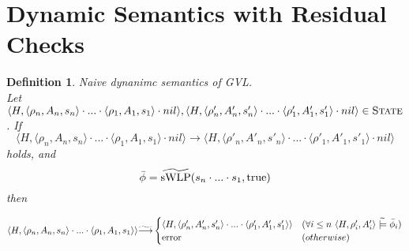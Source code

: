 \documentclass {article}
\newtheorem{definition}[theorem]{Definition}
\newcommand{\true}{\text{true}}
\newcommand{\tconsistent}{\hspace{1mm}\widetilde{\models}\hspace{1mm}}
\newcommand{\tswlp}[2]{\widetilde{\textup{sWLP}}(#1,#2)}
\newcommand{\error}{\text{error}}
\begin{document}
\section{Dynamic Semantics with Residual Checks}
\begin{definition} Naive dynanimc semantics of GVL.\\
Let $\langle H,\langle \rho_n, A_n, s_n\rangle \cdot ... \cdot \langle \rho_1, A_1, s_1\rangle \cdot nil \rangle, \langle H,\langle \rho'_n, A'_n, s'_n\rangle \cdot ... \cdot \langle \rho'_1, A'_1, s'_1\rangle \cdot nil \rangle \in \textsc{State}$. If $$\langle H,\langle \rho_n, A_n, s_n\rangle \cdot ... \cdot \langle \rho_1, A_1, s_1\rangle \cdot nil \rangle \longrightarrow \langle H,\langle \rho'_n, A'_n, s'_n\rangle \cdot ... \cdot \langle \rho'_1, A'_1, s'_1\rangle \cdot nil\rangle$$ holds, and $$\bar{\phi} = \tswlp{s_n \cdot ... \cdot s_1}{\true}$$ then\\
\begin{center}
$  \langle H,\langle \rho_n, A_n, s_n\rangle \cdot ... \cdot \langle \rho_1, A_1, s_1\rangle \rangle \widetilde{\longrightarrow}
\begin{cases}
	 \langle H,\langle \rho'_n, A'_n, s'_n\rangle \cdot ... \cdot \langle \rho'_1, A'_1, s'_1\rangle \rangle & (\forall i \leq n \text{ }\langle H, \rho'_i, A'_i \rangle \tconsistent \bar{\phi}_i)\\
	 \error &(otherwise)
\end{cases}
$
\end{center}

\end{definition}
\end{document}
